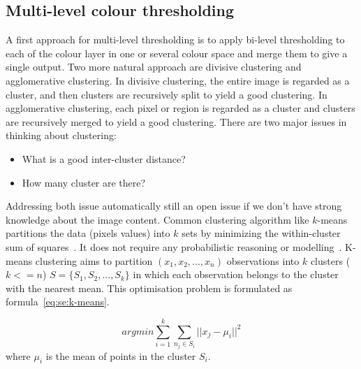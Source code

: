 
\subsection{Multi-level colour thresholding} %
\label{sub:ap:muli_threshold}

A first approach for multi-level thresholding is to apply bi-level thresholding to each of the colour layer in one or several colour space and merge them to give a single output.
Two more natural approach are divisive clustering and agglomerative clustering.
In divisive clustering, the entire image is regarded as a cluster, and then clusters are recursively split to yield a good clustering.
In agglomerative clustering, each pixel or region is regarded as a cluster and clusters are recursively merged to yield a good clustering.
There are two major issues in thinking about clustering:
\begin{itemize}
	\item What is a good inter-cluster distance?
	\item How many cluster are there?
\end{itemize}
Addressing both issue automatically still an open issue if we don't have strong knowledge about the image content.
Common clustering algorithm like $k$-means partitions the data (pixels values) into $k$ sets by minimizing the within-cluster sum of squares~\cite{PonceForsyth2012}.
It does not require any probabilistic reasoning or modelling~\cite{Bishop2006PRM}.
K-means clustering aims to partition $(x_1, x_2, ...,x_n)$ observations into $k$ clusters ($k <= n$) $S=\{S_1, S_2, ..., S_k\}$ in which each observation belongs to the cluster with the nearest mean.
This optimisation problem is formulated as formula~\ref{eq:se:k-means}.

\begin{equation}
	arg min \sum\limits_{i=1}^k \sum\limits_{n_j \in S_i} ||x_j - \mu_i||^2
	\label{eq:se:k-means}
\end{equation}
where $\mu_i$ is the mean of points in the cluster $S_i$.













